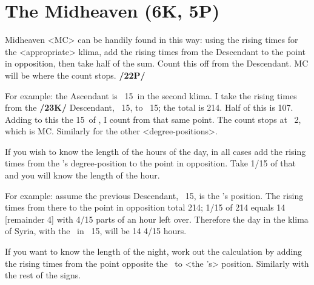 \section{The Midheaven (6K, 5P)}
Midheaven <MC> can be handily found in this way: using the rising times for the <appropriate> klima, add the rising times from the Descendant to the point in opposition, then take half of the sum.
Count this off from the Descendant. MC will be where the count stops. \textbf{/22P/} 

For example: the Ascendant is \Capricorn\, 15\deg\, in the second klima. I take the rising times from the \textbf{/23K/} Descendant, \Cancer\, 15\deg, to \Capricorn\, 15\deg; the total is 214. Half of this is 107. Adding to this the 15\deg\, of \Cancer, I count from that same point. The count stops at \Scorpio\, 2\deg, which is MC. Similarly for the other <degree-positions>.

If you wish to know the length of the hours of the day, in all cases add the rising times from the \Sun’s degree-position to the point in opposition. Take 1/15 of that and you will know the length of the hour.

For example: assume the previous Descendant, \Cancer\, 15\deg, is the \Sun’s position. The rising times from there to the point in opposition total 214; 1/15 of 214 equals 14 [remainder 4] with 4/15 parts of an hour left over. Therefore the day in the klima of Syria, with the \Sun\, in \Cancer\, 15\deg, will be 14 4/15 hours. 

If you want to know the length of the night, work out the calculation by adding the rising times from the point opposite the \Sun\, to <the \Sun’s> position. Similarly with the rest of the signs.

\newpage